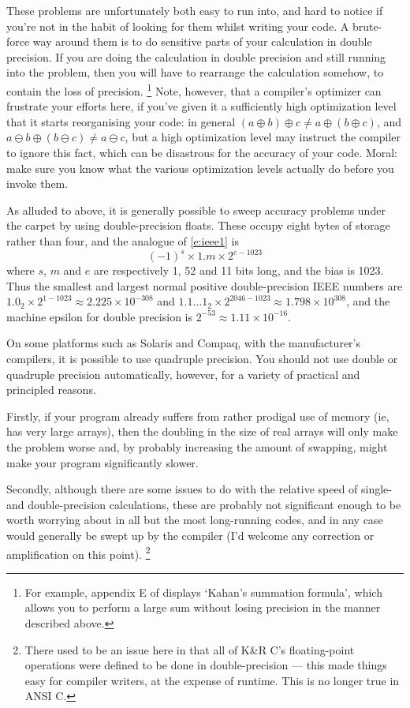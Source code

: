 \documentclass[11pt,oneside,chapters]{starlink}
\begin{document}
These problems are unfortunately
both easy to run into, and hard to notice if you're not
in the habit of looking for them whilst writing your
code.  A brute-force way around them is to do sensitive
parts of your calculation in double precision.  If you
are doing the calculation in double precision and still
running into the problem, then you will have to
rearrange the calculation somehow, to contain the loss
of precision.
\footnote{For example, appendix E of
\citet{sunncg} displays `Kahan's summation
formula', which allows you to perform a large sum
without losing precision in the manner described
above.}
Note, however, that a compiler's
optimizer can frustrate your efforts here, if you've
given it a sufficiently high optimization level that it
starts reorganising your code: in general
$(a\oplus b)\oplus c \neq a\oplus (b\oplus c)$, and
$a\ominus b\oplus(b\ominus c)\neq a\ominus c$, but a high
optimization level may instruct the compiler to ignore
this fact, which can be disastrous for the accuracy of
your code.  Moral: make sure you know what the various
optimization levels actually do before you invoke them.

As alluded to above, it is generally possible to
sweep accuracy problems under the carpet by using
double-precision floats.  These occupy eight bytes of
storage rather than four, and the analogue of
\ref{e:ieee1} is
\begin{equation}
(-1)^s \times 1.m \times 2^{e-1023}
\end{equation}
where $s$,
$m$ and
$e$ are respectively 1, 52 and
11 bits long, and the bias is 1023.  Thus the smallest
and largest normal positive double-precision IEEE
numbers are $1.0_2\times2^{1-1023}\approx2.225\times10^{-308}$
and $1.1\dots1_2\times2^{2046-1023}\approx1.798\times10^{308}$,
and the machine epsilon for double precision is
$2^{-53}\approx1.11\times10^{-16}$.

On some platforms such as Solaris and Compaq, with the
manufacturer's compilers, it is possible to use
quadruple precision.  You should not use double or
quadruple precision automatically, however, for a
variety of practical and principled reasons.

Firstly, if your program already suffers from
rather prodigal use of memory (ie, has very large
arrays), then the doubling in the size of real arrays
will only make the problem worse and, by probably
increasing the amount of swapping, might make your
program significantly slower.

Secondly, although
there are some issues to do with the relative speed of
single- and double-precision calculations, these are
probably not significant enough to be worth worrying
about in all but the most long-running codes, and in any
case would generally be swept up by the compiler (I'd
welcome any correction or amplification on this
point).
\footnote{There used to be an issue here in that
all of K\&R C's floating-point operations were
defined to be done in double-precision --- this made
things easy for compiler writers, at the expense of
runtime.  This is no longer true in ANSI C.}
\end{document}
